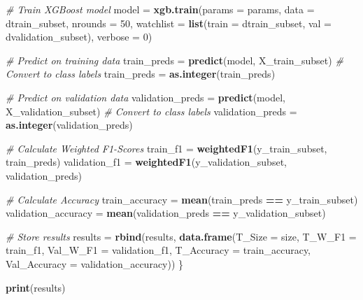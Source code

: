 \documentclass[
]{article}
\newenvironment{Shaded}{\begin{snugshade}}{\end{snugshade}}
\newcommand{\AttributeTok}[1]{\textcolor[rgb]{0.13,0.29,0.53}{#1}}
\newcommand{\CommentTok}[1]{\textcolor[rgb]{0.56,0.35,0.01}{\textit{#1}}}
\newcommand{\DecValTok}[1]{\textcolor[rgb]{0.00,0.00,0.81}{#1}}
\newcommand{\FunctionTok}[1]{\textcolor[rgb]{0.13,0.29,0.53}{\textbf{#1}}}
\newcommand{\NormalTok}[1]{#1}
\newcommand{\OtherTok}[1]{\textcolor[rgb]{0.56,0.35,0.01}{#1}}
\newcommand{\SpecialCharTok}[1]{\textcolor[rgb]{0.81,0.36,0.00}{\textbf{#1}}}
\begin{document}
\begin{Shaded}
\begin{Highlighting}[]
  \CommentTok{\# Train XGBoost model}
\NormalTok{  model }\OtherTok{=} \FunctionTok{xgb.train}\NormalTok{(}\AttributeTok{params =}\NormalTok{ params, }
                     \AttributeTok{data =}\NormalTok{ dtrain\_subset, }
                     \AttributeTok{nrounds =} \DecValTok{50}\NormalTok{, }
                     \AttributeTok{watchlist =} \FunctionTok{list}\NormalTok{(}\AttributeTok{train =}\NormalTok{ dtrain\_subset, }\AttributeTok{val =}\NormalTok{ dvalidation\_subset),}
                     \AttributeTok{verbose =} \DecValTok{0}\NormalTok{)}
  
  \CommentTok{\# Predict on training data}
\NormalTok{  train\_preds }\OtherTok{=} \FunctionTok{predict}\NormalTok{(model, X\_train\_subset)}
  \CommentTok{\# Convert to class labels}
\NormalTok{  train\_preds }\OtherTok{=} \FunctionTok{as.integer}\NormalTok{(train\_preds) }
  
  \CommentTok{\# Predict on validation data}
\NormalTok{  validation\_preds }\OtherTok{=} \FunctionTok{predict}\NormalTok{(model, X\_validation\_subset)}
  \CommentTok{\# Convert to class labels}
\NormalTok{  validation\_preds }\OtherTok{=} \FunctionTok{as.integer}\NormalTok{(validation\_preds) }
  
  \CommentTok{\# Calculate Weighted F1{-}Scores}
\NormalTok{  train\_f1 }\OtherTok{=} \FunctionTok{weightedF1}\NormalTok{(y\_train\_subset, train\_preds)}
\NormalTok{  validation\_f1 }\OtherTok{=} \FunctionTok{weightedF1}\NormalTok{(y\_validation\_subset, validation\_preds)}
  
  \CommentTok{\# Calculate Accuracy}
\NormalTok{  train\_accuracy }\OtherTok{=} \FunctionTok{mean}\NormalTok{(train\_preds }\SpecialCharTok{==}\NormalTok{ y\_train\_subset)}
\NormalTok{  validation\_accuracy }\OtherTok{=} \FunctionTok{mean}\NormalTok{(validation\_preds }\SpecialCharTok{==}\NormalTok{ y\_validation\_subset)}
  
  \CommentTok{\# Store results}
\NormalTok{  results }\OtherTok{=} \FunctionTok{rbind}\NormalTok{(results, }\FunctionTok{data.frame}\NormalTok{(}\AttributeTok{T\_Size =}\NormalTok{ size, }
                                       \AttributeTok{T\_W\_F1 =}\NormalTok{ train\_f1, }
                                       \AttributeTok{Val\_W\_F1 =}\NormalTok{ validation\_f1,}
                                       \AttributeTok{T\_Accuracy =}\NormalTok{ train\_accuracy,}
                                       \AttributeTok{Val\_Accuracy =}\NormalTok{ validation\_accuracy))}
\NormalTok{\}}

\FunctionTok{print}\NormalTok{(results)}
\end{Highlighting}
\end{Shaded}
\end{document}
